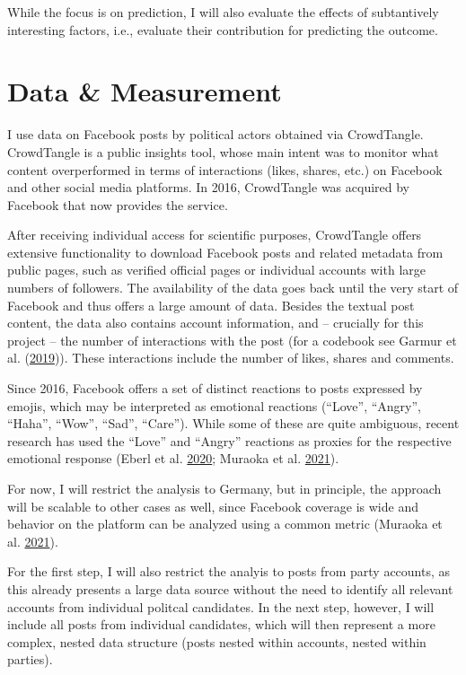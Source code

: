 \documentclass[
  12pt,
]{article}
\begin{document}
While the focus is on prediction, I will also evaluate the effects of subtantively interesting factors, i.e., evaluate their contribution for predicting the outcome.

\hypertarget{data-measurement}{%
\section{Data \& Measurement}\label{data-measurement}}

I use data on Facebook posts by political actors obtained via CrowdTangle. CrowdTangle is a public insights tool, whose main intent was to monitor what content overperformed in terms of interactions (likes, shares, etc.) on Facebook and other social media platforms. In 2016, CrowdTangle was acquired by Facebook that now provides the service.

After receiving individual access for scientific purposes, CrowdTangle offers extensive functionality to download Facebook posts and related metadata from public pages, such as verified official pages or individual accounts with large numbers of followers. The availability of the data goes back until the very start of Facebook and thus offers a large amount of data. Besides the textual post content, the data also contains account information, and -- crucially for this project -- the number of interactions with the post (for a codebook see Garmur et al. (\protect\hyperlink{ref-garmur2019crowdtangle}{2019})). These interactions include the number of likes, shares and comments.

Since 2016, Facebook offers a set of distinct reactions to posts expressed by emojis, which may be interpreted as emotional reactions (``Love'', ``Angry'', ``Haha'', ``Wow'', ``Sad'', ``Care''). While some of these are quite ambiguous, recent research has used the ``Love'' and ``Angry'' reactions as proxies for the respective emotional response (Eberl et al. \protect\hyperlink{ref-eberl2020what}{2020}; Muraoka et al. \protect\hyperlink{ref-muraoka2021love}{2021}).

For now, I will restrict the analysis to Germany, but in principle, the approach will be scalable to other cases as well, since Facebook coverage is wide and behavior on the platform can be analyzed using a common metric (Muraoka et al. \protect\hyperlink{ref-muraoka2021love}{2021}).

For the first step, I will also restrict the analyis to posts from party accounts, as this already presents a large data source without the need to identify all relevant accounts from individual politcal candidates. In the next step, however, I will include all posts from individual candidates, which will then represent a more complex, nested data structure (posts nested within accounts, nested within parties).
\end{document}
